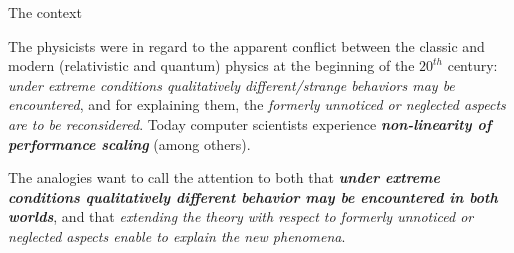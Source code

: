 



{
\articleonly{} 

\articleonly{
}	
	The context
}%





{%
	The physicists were in regard to the apparent conflict between the classic and modern (relativistic and quantum) physics at the beginning of the $20^{th}$ century: \textit{under extreme conditions qualitatively different/strange behaviors may be encountered}, and for explaining them, the \textit{formerly unnoticed or neglected aspects are to be reconsidered}.
	Today computer scientists  experience \textbf{\textit{non-linearity of performance scaling}}  (among others).
	
	{The analogies want to call the attention to both that
		\textbf{\textit{under extreme conditions qualitatively different behavior may be encountered in both worlds}}, and
		that \textit{extending the theory with respect to formerly unnoticed or neglected aspects enable to explain
			the new phenomena}.}
	
}  

